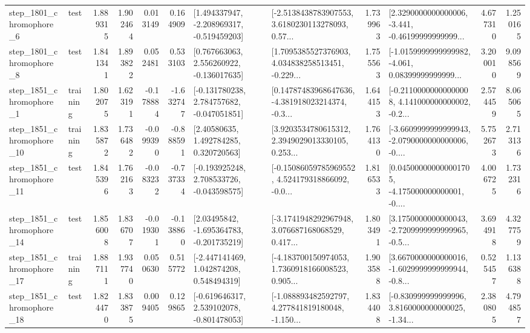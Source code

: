 \begin{tabular}{llrrrrllrlrr}
  step\_1801\_chromophore\_6 &      test &      1.889315 &    1.902464 &      0.013149 &  0.164909 &   [1.494337947, -2.208969317, -0.519459203] &  [-2.5138438783907553, 3.6180230113278093, 0.57... &       1.739963 &  [2.3290000000000006, -3.441, -0.46199999999999... &            4.677310 &          1.250165 \\
  step\_1801\_chromophore\_8 &      test &      1.841341 &    1.893822 &      0.052481 &  0.533103 &    [0.767663063, 2.556260922, -0.136017635] &  [1.7095385527376903, 4.034838258513451, -0.229... &       1.755563 &  [-1.0159999999999982, -4.061, 0.08399999999999... &            3.200010 &          9.098569 \\
  step\_1851\_chromophore\_1 &  training &      1.802075 &    1.623191 &     -0.178884 & -1.632747 &   [-0.131780238, 2.784757682, -0.047051851] &  [0.14787483968647636, -4.381918023214374, -0.3... &       1.644153 &  [-0.21100000000000008, 4.141000000000002, -0.2... &            2.574459 &          8.065065 \\
 step\_1851\_chromophore\_10 &  training &      1.835872 &    1.736482 &     -0.099390 & -0.888591 &      [2.40580635, 1.492784285, 0.320720563] &  [3.9203534780615312, 2.3949029013330105, 0.253... &       1.764130 &  [-3.6609999999999943, -2.0790000000000006, -0.... &            5.752673 &          2.713136 \\
 step\_1851\_chromophore\_11 &      test &      1.845396 &    1.762163 &     -0.083232 & -0.737334 &   [-0.193925248, 2.708533726, -0.043598575] &  [-0.15086059785969552, 4.524179318866092, -0.0... &       1.816533 &  [0.045000000000001705, -4.175000000000001, -0.... &            4.006725 &          1.732316 \\
 step\_1851\_chromophore\_14 &      test &      1.856008 &    1.836707 &     -0.019301 & -0.138860 &    [2.03495842, -1.695364783, -0.201735219] &  [-3.1741948292967948, 3.076687168068529, 0.417... &       1.803491 &  [3.1750000000000043, -2.7209999999999965, -0.5... &            3.694918 &          4.327759 \\
 step\_1851\_chromophore\_17 &  training &      1.887111 &    1.937740 &      0.050630 &  0.515772 &    [-2.447141469, 1.042874208, 0.548494319] &  [-4.183700150974053, 1.7360918166008523, 0.905... &       1.903588 &  [3.6670000000000016, -1.6029999999999944, -0.8... &            0.525457 &          1.136388 \\
 step\_1851\_chromophore\_18 &      test &      1.824470 &    1.833875 &      0.009405 &  0.129865 &   [-0.619646317, 2.539102078, -0.801478053] &  [-1.088893482592797, 4.277841819180048, -1.150... &       1.834408 &  [-0.830999999999996, 3.8160000000000025, -1.34... &            2.380805 &          4.794857 \\

\end{tabular}

